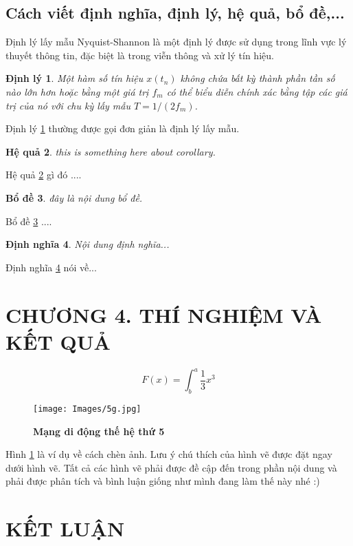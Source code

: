 \documentclass{article} %
\newtheorem{theorem}{Định lý}[section]
\newtheorem{defn}[theorem]{Định nghĩa}
\newtheorem{corollary}[theorem]{Hệ quả}
\newtheorem{lemma}[theorem]{Bổ đề}
\begin{document}
\subsection{Cách viết định nghĩa, định lý, hệ quả, bổ đề,...}
Định lý lấy mẫu Nyquist-Shannon là một định lý được sử dụng trong lĩnh vực lý thuyết thông tin, đặc biệt là trong viễn thông và xử lý tín hiệu.
\begin{theorem}\label{đlNq} %
Một hàm số tín hiệu $x(t_n)$ không chứa bất kỳ thành phần tần số nào lớn hơn hoặc bằng một giá trị $f_m$ có thể biểu diễn chính xác bằng tập các giá trị của nó với chu kỳ lấy mẫu $T=1/(2f_m)$.
\end{theorem}
Định lý \ref{đlNq} thường được gọi đơn giản là định lý lấy mẫu.
\begin{corollary}\label{coro1}
this is something here about corollary.
\end{corollary}
Hệ quả \ref{coro1} gì đó ....
\begin{lemma}\label{lemma1}
đây là nội dung bổ đề.
\end{lemma}
Bổ đề \ref{lemma1} ....
\begin{defn}\label{defn1}
Nội dung định nghĩa...
\end{defn}
Định nghĩa \ref{defn1} nói về...
\newpage
\section*{CHƯƠNG 4. THÍ NGHIỆM VÀ KẾT QUẢ}
\setcounter{section}{4}
\setcounter{figure}{0}
\setcounter{table}{0}
\setcounter{equation}{0}
\begin{equation}\label{pt3111}
    F(x) = \int^a_b \frac{1}{3}x^3
\end{equation}
\lipsum
\begin{figure}[!ht]
    \centering
    \texttt{[image: Images/5g.jpg]}
    \caption[Mạng 5G]{\bfseries \fontsize{12pt}{0pt}\selectfont Mạng di động thế hệ thứ 5}
    \label{hinh41}
\end{figure}

Hình \ref{hinh41} là ví dụ về cách chèn ảnh. Lưu ý chú thích của hình vẽ được đặt ngay dưới hình vẽ. Tất cả các hình vẽ phải được đề cập đến trong phần nội dung và phải được phân tích và bình luận giống như mình đang làm thế này nhé :)
\newpage
\section*{KẾT LUẬN}
\end{document}
